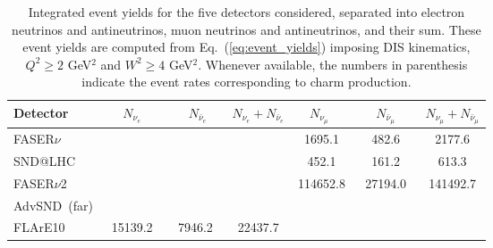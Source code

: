 \begin{table}[t]
  \centering
  \small
  \renewcommand{\arraystretch}{1.70}
\begin{tabularx}{\textwidth}{X|c|c|c|c|c|c}
\toprule
Detector & $\quad$ $N_{\nu_e}$ $\quad$ &$\quad$ $N_{\bar{\nu}_e}$$\quad$   &   $N_{\nu_e} + N_{\bar{\nu}_e}$ &
$\quad$$N_{\nu_\mu}$ $\quad$ & $\quad$ $N_{\bar{\nu}_\mu}$ $\quad$  &   $N_{\nu_\mu} + N_{\bar{\nu}_\mu}$ \\
\midrule
\midrule
FASER$\nu$  &    &    &   &  1695.1  &  482.6  &  2177.6  \\
SND@LHC  &    &    &   &  452.1 & 161.2   &  613.3  \\
\midrule
\midrule
FASER$\nu$2  &    &    &   & 114652.8  & 27194.0    & 141492.7   \\
AdvSND~(far)  &    &    &   &   &    &    \\
FLArE10 &   15139.2 & 7946.2   &  22437.7 &   &    &    \\
  \bottomrule
\end{tabularx}
\vspace{0.2cm}
\caption{\small Integrated event yields for the five detectors considered,
  separated into electron neutrinos and antineutrinos,
  muon neutrinos and antineutrinos, and their sum.
  These event yields are computed from Eq.~(\ref{eq:event_yields})
  imposing DIS kinematics, $Q^2 \ge 2$ GeV$^2$ and $W^2 \ge 4$ GeV$^2$.
  Whenever available, the
  numbers in parenthesis indicate the event rates corresponding to charm
  production.
  \label{tab:integrated_rates}
}
\end{table}
